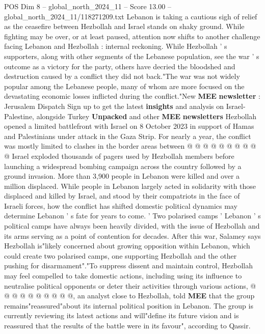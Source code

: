 \begin{textsample}{POS Dim 8 – global\_north\_2024\_11 – Score 13.00 – global\_north\_2024\_11/118271209.txt}  \label{ex:f8_pos_058}
Lebanon is taking a cautious sigh of relief as the ceasefire between Hezbollah and Israel stands on shaky ground.
While fighting may be over, or at least paused, attention now shifts to another challenge facing Lebanon and Hezbollah : internal reckoning.
While Hezbollah ' s supporters, along with other segments of the Lebanese population, see the war ' s outcome as a victory for the party, others have decried the bloodshed and destruction caused by a conflict they did not back."The war was not widely popular among the Lebanese people, many of whom are more focused on the devastating economic losses inflicted during the conflict."New \textbf{MEE} \textbf{newsletter} : Jerusalem Dispatch Sign up to get the latest \textbf{insights} and analysis on Israel-Palestine, alongside Turkey \textbf{Unpacked} and other \textbf{MEE} \textbf{newsletters} Hezbollah opened a limited battlefront with Israel on 8 October 2023 in support of Hamas and Palestinians under attack in the Gaza Strip.
For nearly a year, the conflict was mostly limited to clashes in the border areas between @ @ @ @ @ @ @ @ @ @ Israel exploded thousands of pagers used by Hezbollah members before launching a widespread bombing campaign across the country followed by a ground invasion.
More than 3,900 people in Lebanon were killed and over a million displaced.
While people in Lebanon largely acted in solidarity with those displaced and killed by Israel, and stood by their compatriots in the face of Israeli forces, how the conflict has shifted domestic political dynamics may determine Lebanon ' s fate for years to come. ' Two polarised camps ' Lebanon ' s political camps have always been heavily divided, with the issue of Hezbollah and its arms serving as a point of contention for decades.
After this war, Salamey says Hezbollah is"likely concerned about growing opposition within Lebanon, which could create two polarised camps, one supporting Hezbollah and the other pushing for disarmament"."To suppress dissent and maintain control, Hezbollah may feel compelled to take domestic actions, including using its influence to neutralise political opponents or deter their activities through various actions, @ @ @ @ @ @ @ @ @ @, an analyst close to Hezbollah, told \textbf{MEE} that the group remains"reassured"about its internal political position in Lebanon.
The group is currently reviewing its latest actions and will"define its future vision and is reassured that the results of the battle were in its favour", according to Qassir.

\end{textsample}
